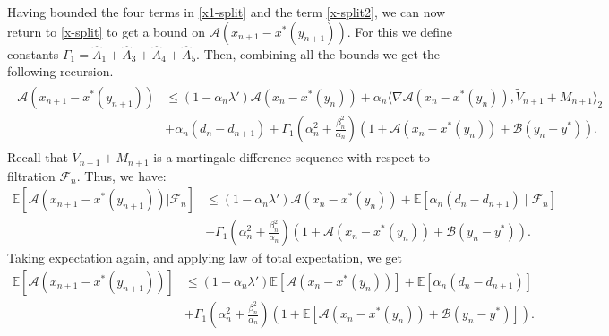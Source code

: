 \documentclass[letterpaper, 10 pt, conference]{ieeeconf}  %
\theoremstyle{definition}
\theoremstyle{plain}
\newcommand{\xstar}{x^*}
\newcommand{\hA}{\hat{A}}
\newcommand{\EE}{\mathbb{E}}
\newcommand{\Acal}{\mathcal{A}}
\newcommand{\Bcal}{\mathcal{B}}
\begin{document}
Having bounded the four terms in \eqref{x1-split} and the term \eqref{x-split2}, we can now return to \eqref{x-split} to get a bound on $\Acal(x_{n+1}-\xstar(y_{n+1}))$. For this we define constants $\Gamma_1=\hA_1+\hA_3+\hA_4+\hA_5$. Then, combining all the bounds we get the following recursion. 
\begin{align*}
\begin{split}
    \Acal(x_{n+1}-\xstar(y_{n+1}))&\leq (1-\alpha_n\lambda')\Acal(x_{n}-\xstar(y_n))+\alpha_n\langle\nabla \Acal(x_n-\xstar(y_n)),{\tilde{V}_{n+1}}+M_{n+1}\rangle_2\\
    &+\alpha_n(d_n-d_{n+1})+\Gamma_1\left(\alpha_n^2+\frac{\beta_n^2}{\alpha_n}\right)\left(1+\Acal(x_n-x^*(y_n))+\Bcal(y_n-y^*)\right).
\end{split}   
\end{align*}
Recall that ${\tilde{V}_{n+1}}+M_{n+1}$ is a martingale difference sequence with respect to filtration $\mathcal{F}_n$. Thus, we have:
\begin{align*}
    \EE[\Acal(x_{n+1}-\xstar(y_{n+1}))|\mathcal{F}_n]&\leq (1-\alpha_n\lambda')\Acal(x_{n}-\xstar(y_n))+\EE\left[\alpha_n(d_n-d_{n+1})\mid\mathcal{F}_n\right]\\
    &+\Gamma_1\left(\alpha_n^2+\frac{\beta_n^2}{\alpha_n}\right)\left(1+\Acal(x_n-x^*(y_n))+\Bcal(y_n-y^*)\right).  
\end{align*}
Taking expectation again, and applying law of total expectation, we get
\begin{align}\label{x-exp-rec-inter}
    \EE[\Acal(x_{n+1}-\xstar(y_{n+1}))]&\leq (1-\alpha_n\lambda')\EE[\Acal(x_{n}-\xstar(y_n))]+\EE\left[\alpha_n(d_n-d_{n+1})\right]\nonumber\\
    &+\Gamma_1\left(\alpha_n^2+\frac{\beta_n^2}{\alpha_n}\right)\left(1+\EE[\Acal(x_n-x^*(y_n))+\Bcal(y_n-y^*)]\right).  
\end{align}
\end{document}
